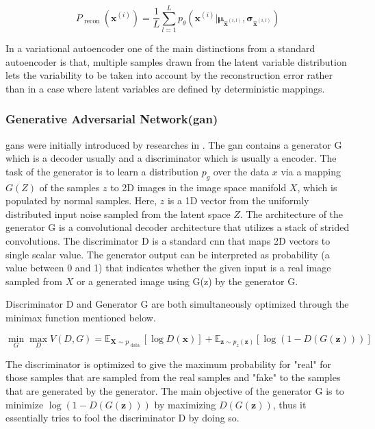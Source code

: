 \documentclass[a4paper,12pt]{report}
\begin{document}
\begin{itemize}
\begin{equation}
P _ { \text { recon } } \left( \mathbf { x } ^ { ( i ) } \right) = \frac { 1 } { L } \sum _ { l = 1 } ^ { L } p _ { \theta } \left( \mathbf { x } ^ { ( i ) } | \boldsymbol { \mu } _ { \hat { \mathbf { x } } ^ { ( i , l ) } } , \boldsymbol { \sigma } _ { \hat { \mathbf { x } } ^ { ( i , l ) } } \right)
\end{equation}

In a variational autoencoder one of the main distinctions from a standard autoencoder is that, multiple samples drawn from the latent variable distribution lets the variability to be taken into account by the reconstruction error rather than in a case where latent variables are defined by deterministic mappings.

\subsubsection{Generative Adversarial Network(\gls{gan})}

\gls{gan}s were initially introduced by researches in \cite{65}. The \gls{gan} contains a generator G  which is a decoder usually and a discriminator which is usually a encoder. The task of the generator is to learn a distribution $p_g$ over the data $x$ via a mapping $G(Z)$ of the samples $z$ to 2D images in the image space manifold $X$, which is populated by normal samples. Here, $z$ is a 1D vector from the uniformly distributed input noise sampled from the latent space $Z$. The architecture of the generator G is a convolutional decoder architecture that utilizes a stack of strided convolutions. The discriminator D is a standard \gls{cnn} that maps 2D vectors to single scalar value. The generator output can be interpreted as probability (a value between 0 and 1) that indicates whether the given input is a real image sampled from $X$ or a generated image using G(z) by the generator G.

Discriminator D and Generator G are both simultaneously optimized through the minimax function mentioned below. 

\begin{equation}
    \min _ { G } \max _ { D } V ( D , G ) = \mathbb { E } _ { \mathbf { X } \sim p _ { \text { data } } } [ \log D ( \mathbf { x } ) ] + \mathbb { E } _ { \mathbf { z } \sim p _ { z } ( \mathbf { z } ) } [ \log ( 1 - D ( G ( \mathbf { z } ) ) ) ]
\end{equation}

The discriminator is optimized to give the maximum probability for "real" for those samples that are sampled from the real samples and "fake" to the samples that are generated by the generator. The main objective of the generator G is to minimize $\log ( 1 - D ( G ( \mathbf { z } ) ) )$ by maximizing $D ( G ( \mathbf { z } ) ) $, thus it essentially tries to fool the discriminator D by doing so. 


\end{itemize}
\end{document}
